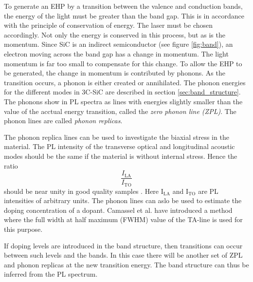 To generate an EHP by a transition between the valence and conduction bands, the energy of the light must be greater than the band gap. This is in accordance with the principle of conservation of energy. The laser must be chosen accordingly. Not only the energy is conserved in this process, but as is the momentum. Since SiC is an indirect semiconductor (see figure \ref{fig:band}), an electron moving across the band gap has a change in momentum. The light momentum is far too small to compensate for this change. To allow the EHP to be generated, the change in momentum is contributed by phonons. As the transition occurs, a phonon is either created or annihilated. The phonon energies for the different modes in 3C-SiC are described in section \ref{sec:band_structure}. The phonons show in PL spectra as lines with energies slightly smaller than the value of the acctual energy transition, called the \emph{zero phonon line (ZPL)}. The phonon lines are called \emph{phonon replicas}. 

The phonon replica lines can be used to investigate the biaxial stress in the material. The PL intensity of the transverse optical and longitudinal acoustic modes should be the same if the material is without internal stress. Hence the ratio 
\[\frac{I_{\mathrm{LA}}}{I_{\mathrm{TO}}}\]
should be near unity in good quality samples \cite{Sun2012b}. Here I$_\mathrm{LA}$ and I$_\mathrm{TO}$ are PL intensities of arbitrary units. The phonon lines can aslo be used to estimate the doping concentration of a dopant. Camassel et al. have introduced a method where the full width at half maximum (FWHM) value of the TA-line is used for this purpose. 

If doping levels are introduced in the band structure, then transitions can occur between such levels and the bands. In this case there will be another set of ZPL and phonon replicas at the new transition energy. The band structure can thus be inferred from the PL spectrum. 

